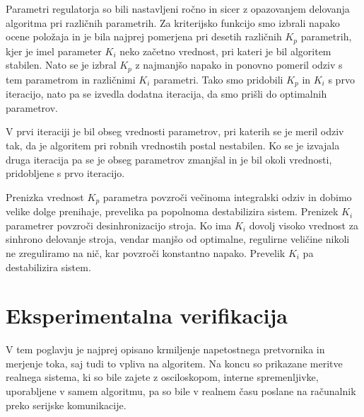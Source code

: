 \documentclass[a4paper,twoside,openright,12pt,slovene]{book}
\begin{document}
Parametri regulatorja so bili nastavljeni ročno in sicer z opazovanjem delovanja algoritma pri različnih parametrih. Za kriterijsko funkcijo smo izbrali napako ocene položaja in je bila najprej
pomerjena pri desetih različnih $K_p$ parametrih, kjer je imel parameter $K_i$ neko začetno vrednost, pri kateri je bil algoritem stabilen. Nato se je izbral $K_p$ z najmanjšo napako in ponovno
pomeril odziv s tem parametrom in različnimi $K_i$ parametri. Tako smo pridobili $K_p$ in $K_i$ s prvo iteracijo, nato pa se izvedla dodatna iteracija, da smo prišli do optimalnih parametrov. 

V prvi iteraciji je bil obseg vrednosti parametrov, pri katerih se je meril odziv tak, da je algoritem pri robnih vrednostih postal nestabilen. Ko se je izvajala druga iteracija pa se je obseg
parametrov zmanjšal in je bil okoli vrednosti, pridobljene s prvo iteracijo.

Prenizka vrednost $K_p$ parametra povzroči večinoma integralski odziv in dobimo velike dolge prenihaje, prevelika pa popolnoma destabilizira sistem. Prenizek $K_i$ parametrer povzroči desinhronizacijo
stroja. Ko ima $K_i$ dovolj visoko vrednost za sinhrono delovanje stroja, vendar manjšo od optimalne, regulirne veličine nikoli ne zreguliramo na nič, kar povzroči konstantno napako.  Prevelik $K_i$
pa destabilizira sistem.

\chapter{Eksperimentalna verifikacija}  \label{eksperimenti}

V tem poglavju je najprej opisano krmiljenje napetostnega pretvornika in merjenje toka, saj tudi to vpliva na algoritem. Na koncu so prikazane meritve realnega sistema, ki so bile zajete z
osciloskopom, interne spremenljivke, uporabljene v samem algoritmu, pa so bile v realnem času poslane na računalnik preko serijske komunikacije.
\end{document}
